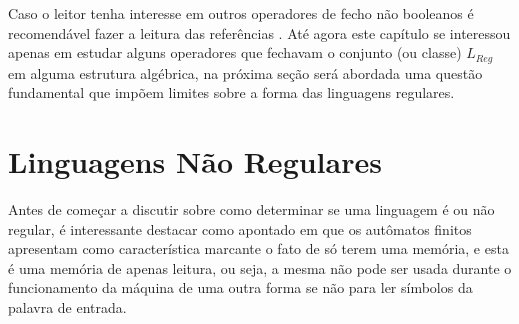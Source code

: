 Caso o leitor tenha interesse em outros operadores de fecho não booleanos é recomendável fazer a leitura das referências \cite{benjaLivro2010, carroll1989}. Até agora este capítulo se interessou apenas em estudar alguns operadores que fechavam o conjunto (ou classe) $L_{Reg}$ em alguma estrutura algébrica, na próxima seção será abordada uma questão fundamental que impõem limites sobre a forma das linguagens regulares.

\section{Linguagens Não Regulares}

Antes de começar a discutir sobre como determinar se uma linguagem é ou não regular, é interessante destacar como apontado em \cite{benjaLivro2010, linz2006, menezes1998LFA} que os autômatos finitos apresentam como característica marcante o fato de só terem uma memória, e esta é uma memória de apenas leitura, ou seja, a mesma não pode ser usada durante o funcionamento da máquina de uma outra forma se não para ler símbolos da palavra de entrada.